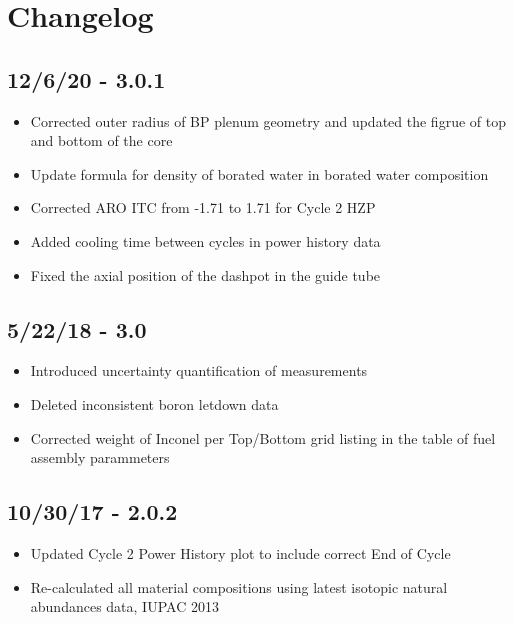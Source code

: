 \section*{Changelog}

\subsection*{12/6/20 - 3.0.1}
\begin{itemize}
  \item Corrected outer radius of BP plenum geometry and updated the figrue of
	top and bottom of the core
  \item Update formula for density of borated water in borated water composition
  \item Corrected ARO ITC from -1.71 to 1.71 for Cycle 2 HZP
  \item Added cooling time between cycles in power history data
  \item Fixed the axial position of the dashpot in the guide tube
\end{itemize}

\subsection*{5/22/18 - 3.0}
\begin{itemize}
  \item Introduced uncertainty quantification of measurements
  \item Deleted inconsistent boron letdown data
  \item Corrected weight of Inconel per Top/Bottom grid listing in the table of
        fuel assembly parammeters
\end{itemize}

\subsection*{10/30/17 - 2.0.2}
\begin{itemize}
  \item Updated Cycle 2 Power History plot to include correct End of Cycle
  \item Re-calculated all material compositions using latest isotopic natural
        abundances data, IUPAC 2013
\end{itemize}

